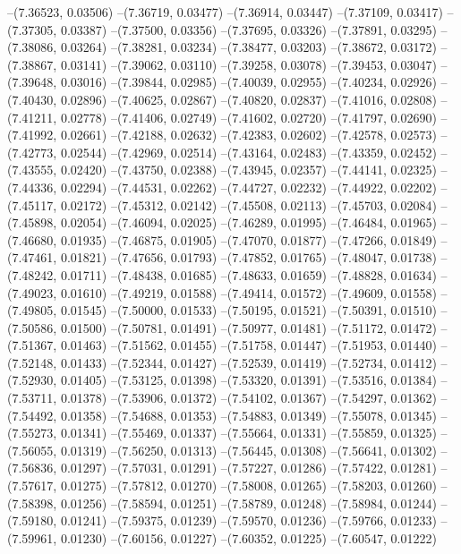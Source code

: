--(7.36523, 0.03506)
--(7.36719, 0.03477)
--(7.36914, 0.03447)
--(7.37109, 0.03417)
--(7.37305, 0.03387)
--(7.37500, 0.03356)
--(7.37695, 0.03326)
--(7.37891, 0.03295)
--(7.38086, 0.03264)
--(7.38281, 0.03234)
--(7.38477, 0.03203)
--(7.38672, 0.03172)
--(7.38867, 0.03141)
--(7.39062, 0.03110)
--(7.39258, 0.03078)
--(7.39453, 0.03047)
--(7.39648, 0.03016)
--(7.39844, 0.02985)
--(7.40039, 0.02955)
--(7.40234, 0.02926)
--(7.40430, 0.02896)
--(7.40625, 0.02867)
--(7.40820, 0.02837)
--(7.41016, 0.02808)
--(7.41211, 0.02778)
--(7.41406, 0.02749)
--(7.41602, 0.02720)
--(7.41797, 0.02690)
--(7.41992, 0.02661)
--(7.42188, 0.02632)
--(7.42383, 0.02602)
--(7.42578, 0.02573)
--(7.42773, 0.02544)
--(7.42969, 0.02514)
--(7.43164, 0.02483)
--(7.43359, 0.02452)
--(7.43555, 0.02420)
--(7.43750, 0.02388)
--(7.43945, 0.02357)
--(7.44141, 0.02325)
--(7.44336, 0.02294)
--(7.44531, 0.02262)
--(7.44727, 0.02232)
--(7.44922, 0.02202)
--(7.45117, 0.02172)
--(7.45312, 0.02142)
--(7.45508, 0.02113)
--(7.45703, 0.02084)
--(7.45898, 0.02054)
--(7.46094, 0.02025)
--(7.46289, 0.01995)
--(7.46484, 0.01965)
--(7.46680, 0.01935)
--(7.46875, 0.01905)
--(7.47070, 0.01877)
--(7.47266, 0.01849)
--(7.47461, 0.01821)
--(7.47656, 0.01793)
--(7.47852, 0.01765)
--(7.48047, 0.01738)
--(7.48242, 0.01711)
--(7.48438, 0.01685)
--(7.48633, 0.01659)
--(7.48828, 0.01634)
--(7.49023, 0.01610)
--(7.49219, 0.01588)
--(7.49414, 0.01572)
--(7.49609, 0.01558)
--(7.49805, 0.01545)
--(7.50000, 0.01533)
--(7.50195, 0.01521)
--(7.50391, 0.01510)
--(7.50586, 0.01500)
--(7.50781, 0.01491)
--(7.50977, 0.01481)
--(7.51172, 0.01472)
--(7.51367, 0.01463)
--(7.51562, 0.01455)
--(7.51758, 0.01447)
--(7.51953, 0.01440)
--(7.52148, 0.01433)
--(7.52344, 0.01427)
--(7.52539, 0.01419)
--(7.52734, 0.01412)
--(7.52930, 0.01405)
--(7.53125, 0.01398)
--(7.53320, 0.01391)
--(7.53516, 0.01384)
--(7.53711, 0.01378)
--(7.53906, 0.01372)
--(7.54102, 0.01367)
--(7.54297, 0.01362)
--(7.54492, 0.01358)
--(7.54688, 0.01353)
--(7.54883, 0.01349)
--(7.55078, 0.01345)
--(7.55273, 0.01341)
--(7.55469, 0.01337)
--(7.55664, 0.01331)
--(7.55859, 0.01325)
--(7.56055, 0.01319)
--(7.56250, 0.01313)
--(7.56445, 0.01308)
--(7.56641, 0.01302)
--(7.56836, 0.01297)
--(7.57031, 0.01291)
--(7.57227, 0.01286)
--(7.57422, 0.01281)
--(7.57617, 0.01275)
--(7.57812, 0.01270)
--(7.58008, 0.01265)
--(7.58203, 0.01260)
--(7.58398, 0.01256)
--(7.58594, 0.01251)
--(7.58789, 0.01248)
--(7.58984, 0.01244)
--(7.59180, 0.01241)
--(7.59375, 0.01239)
--(7.59570, 0.01236)
--(7.59766, 0.01233)
--(7.59961, 0.01230)
--(7.60156, 0.01227)
--(7.60352, 0.01225)
--(7.60547, 0.01222)
